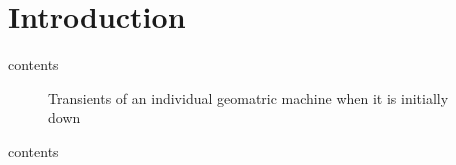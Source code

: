 \chapter{Introduction}
\setlength{\parindent}{2pc}
\noindent contents

\begin{figure*}[!h]
	\centering
	\caption{Transients of an individual geomatric machine when it is initially down}
	\label{introduction}
\end{figure*}

\begin{figure*}[!h]
	\centering
	\label{introduction}
\end{figure*}

contents
